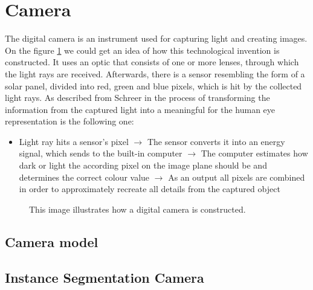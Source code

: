\section{Camera}\label{camera_section}
The digital camera is an instrument used for capturing light and creating images. On the figure \ref{fig:camera_construction} we could get an idea of how this technological invention is constructed. It uses an optic that consists of one or more lenses, through which the light rays are received. Afterwards, there is a sensor resembling the form of a solar panel, divided into red, green and blue pixels, which is hit by the collected light rays. As described from Schreer in \cite{camera_pinhole_model} the process of transforming the information from the captured light into a meaningful for the human eye representation is the following one: 
\begin{itemize}
    \item Light ray hits a sensor's pixel $\rightarrow$ The sensor converts it into an energy signal, which sends to the built-in computer $\rightarrow$ The computer estimates how dark or light the according pixel on the image plane should be and determines the correct colour value $\rightarrow$ As an output all pixels are combined in order to approximately recreate all details from the captured object  
\end{itemize}
 
\begin{figure}
\centering

\caption[Information Generality]{This image illustrates how a digital camera is constructed.\label{fig:camera_construction}}
\end{figure}

\subsection{Camera model}\label{camera_model}

\subsection{Instance Segmentation Camera}\label{instance_camera}


